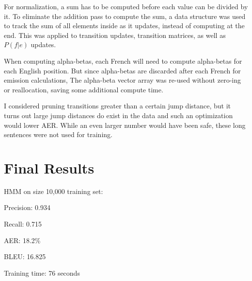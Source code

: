 \documentclass[11pt]{article}
\begin{document}
For normalization, a sum has to be computed before each value can be divided by it.
To eliminate the addition pass to compute the sum, a data structure was used to track the
sum of all elements inside as it updates, instead of computing at the end. This was applied 
to transition updates, transition matrices, as well as $P(f|e)$ updates.

When computing alpha-betas, each French will need to compute alpha-betas for each English
position. But since alpha-betas are discarded after each French for emission calculations, 
The alpha-beta vector array was re-used without zero-ing or reallocation, saving some
additional compute time.

I considered pruning transitions greater than a certain jump distance, but it turns out
large jump distances do exist in the data and such an optimization would lower AER. While
an even larger number would have been safe, these long sentences were not used for training.

\section{Final Results}
HMM on size 10,000 training set:

Precision: 0.934

Recall: 0.715

AER: 18.2\%

BLEU: 16.825

Training time: 76 seconds
\end{document}
